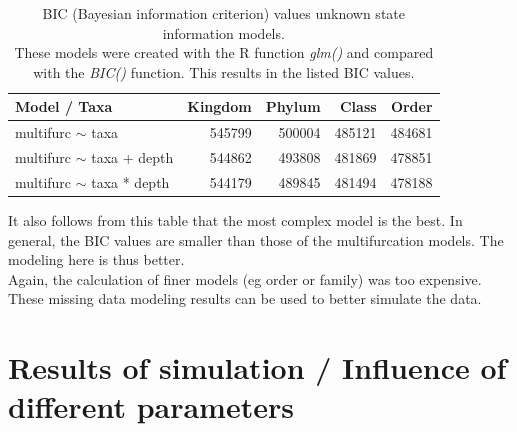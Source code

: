       \begin{table}[h!]
        \begin{center}
          \begin{tabular}{ |l|r|r|r|r| }
            \hline
            \bfseries Model / Taxa & \bfseries Kingdom & \bfseries Phylum & \bfseries Class & \bfseries Order \\
            \hline \hline
            multifurc $\sim$ taxa & \cellcolor{green!15}545799 & \cellcolor{green!35}500004 & \cellcolor{green!45}485121 & \cellcolor{green!45}484681 \\
            \hline
            multifurc $\sim$ taxa + depth & \cellcolor{green!15}544862 & \cellcolor{green!40}493808 & \cellcolor{green!45}481869 & \cellcolor{green!50}478851 \\
            \hline
            multifurc $\sim$ taxa * depth & \cellcolor{green!15}544179 & \cellcolor{green!45}489845 & \cellcolor{green!45}481494 & \cellcolor{green!50}478188 \\
            \hline
          \end{tabular} 
        \end{center}
        \caption{BIC (Bayesian information criterion) values unknown state information models. \\
          These models were created with the R function \textit{glm()} and compared with the 
            \textit{BIC()} function. This results in the listed BIC values.}
        \label{table:BIC unknown information} 
      \end{table}
      It also follows from this table that the most complex model is the best. In general, the BIC 
        values are smaller than those of the multifurcation models. The modeling here is thus better. \\
      Again, the calculation of finer models (eg order or family) was too expensive. \\

      These missing data modeling results can be used to better simulate the data.

  \section{Results of simulation / Influence of different parameters} \label{sec:results of simulation}

